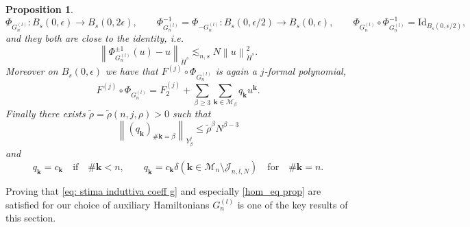 \documentclass[a4paper,10pt,reqno]{article}
\theoremstyle{definition}
\theoremstyle{plain}
\theoremstyle{plain}
\theoremstyle{definition}
\theoremstyle{plain}
\theoremstyle{plain}
\newtheorem{prop}[definition]{Proposition}
\theoremstyle{plain}
\theoremstyle{definition}
\theoremstyle{definition}
\newcommand{\norm}[1]{\left\lVert #1 \right\rVert}
\def \M{\mathcal{M}}
\def \k{\bm{k}}
\begin{document}
\begin{prop}
\[
\Phi_{G_n^{(l)}} : B_s(0,\epsilon) \rightarrow B_s(0,2\epsilon), \qquad \Phi_{G_n^{(l)}}^{-1} = \Phi_{-G_n^{(l)}} : B_s(0,\epsilon/2) \rightarrow B_s(0,\epsilon), \qquad \Phi_{G_n^{(l)}} \circ \Phi_{G_n^{(l)}}^{-1} = \mathrm{Id}_{B_s(0,\epsilon/2)},
\]
and they both are close to the identity, i.e.
\begin{equation} \label{eq: close to id prop}
\norm{\Phi_{G_n^{(l)}}^{\pm 1}(u)-u}_{\dot{H}^s} \lesssim_{n,s} N \norm{u}_{\dot{H}^s}^2.
\end{equation}
Moreover on $B_s(0,\epsilon)$ we have that $F^{(j)} \circ \Phi_{G_n^{(l)}}$ is again a $j$-formal polynomial,
\begin{equation}\label{formula Fj trans prop}
F^{(j)} \circ \Phi_{G_n^{(l)}} = F_2^{(j)} + \sum_{\beta \ge 3} \sum_{\k \in \M_\beta} q_{\k} u^{\k}.
\end{equation}
Finally there exists $\widetilde{\rho}=\widetilde{\rho}(n,j,\rho)>0$ such that 
\begin{equation}\label{eq: stima coeff q}
    \norm{(q_{\k})_{\#\k = \beta}}_{Y_{\beta}^j} \le \widetilde{\rho}^{\beta} N^{\beta-3}
\end{equation}
and
\begin{equation} \label{eq: formula qn}
q_{\k} =  c_{\k} \quad \mbox{if} \quad \#\k<n,\qquad 
q_{\k} =  c_{\k} \delta(\k \in \M_n \setminus \mathcal{J}_{n,l,N}) \quad \text{for} \quad \#\k=n.
\end{equation}
\end{prop}

Proving that \eqref{eq: stima induttiva coeff g}  and especially \eqref{hom_eq prop} are satisfied for our choice of auxiliary Hamiltonians $G_n^{(l)}$ is one of the key results of this section.
\end{document}
